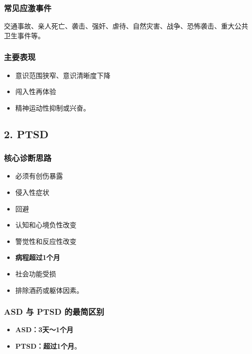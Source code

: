 \documentclass[
  a4paper,
]{ctexart}
\providecommand{\tightlist}{%
  \setlength{\itemsep}{0pt}\setlength{\parskip}{0pt}}
\begin{document}
\subsubsection{常见应激事件}\label{ux5e38ux89c1ux5e94ux6fc0ux4e8bux4ef6}

交通事故、亲人死亡、袭击、强奸、虐待、自然灾害、战争、恐怖袭击、重大公共卫生事件等。

\subsubsection{主要表现}\label{ux4e3bux8981ux8868ux73b0}

\begin{itemize}
\tightlist
\item
  意识范围狭窄、意识清晰度下降
\item
  闯入性再体验
\item
  精神运动性抑制或兴奋。
\end{itemize}

\subsection{2. PTSD}\label{ptsd}

\subsubsection{核心诊断思路}\label{ux6838ux5fc3ux8bcaux65adux601dux8def}

\begin{itemize}
\tightlist
\item
  必须有创伤暴露
\item
  侵入性症状
\item
  回避
\item
  认知和心境负性改变
\item
  警觉性和反应性改变
\item
  \textbf{病程超过1个月}
\item
  社会功能受损
\item
  排除酒药或躯体因素。
\end{itemize}

\subsubsection{ASD 与 PTSD
的最简区别}\label{asd-ux4e0e-ptsd-ux7684ux6700ux7b80ux533aux522b}

\begin{itemize}
\tightlist
\item
  \textbf{ASD：3天～1个月}
\item
  \textbf{PTSD：超过1个月}。
\end{itemize}
\end{document}
